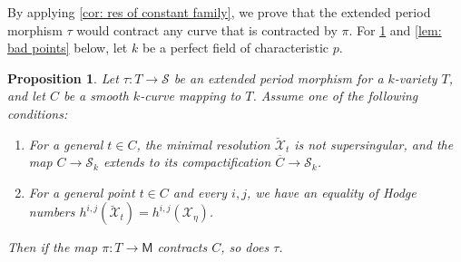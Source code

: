 \documentclass[11pt, letterpaper]{amsart}
\theoremstyle{plain}
\newtheorem{proposition}[theorem]{Proposition}
\theoremstyle{definition}
\newcommand{\<}{\langle}
\renewcommand{\>}{\rangle}
\newcommand{\shS}{\mathscr{S}}
\newcommand{\sfM}{\mathsf{M}}
\newcommand{\sX}{\mathcal{X}}
\begin{document}
By applying \cref{cor: res of constant family}, we prove that the extended period morphism $\tau$ would contract any curve that is contracted by $\pi$. 
For \cref{lem: double contraction} and \cref{lem: bad points} below, let $k$ be a perfect field of characteristic $p$. 
\begin{proposition}
\label{lem: double contraction}
    Let $\tau:T\to \shS$ be an extended period morphism for a $k$-variety $T$, and let $C$ be a smooth $k$-curve mapping to $T$. 
    Assume one of the following conditions:
    \begin{enumerate}[label=\upshape{(\roman*)}]
        \item For a general $t \in C$, the minimal resolution $\breve{\sX}_t$ is not supersingular, and the map $C \to \shS_k$ extends to its compactification $\overline{C}\to \shS_k$. 
        \item For a general point $t \in C$ and every $i,j$, we have an equality of Hodge numbers $h^{i, j}(\breve{\sX}_t) = h^{i, j}(\sX_\eta)$. 
    \end{enumerate}
    Then if the map $\pi:T \to \sfM$ contracts $C$, so does $\tau$. 
\end{proposition}
\end{document}
